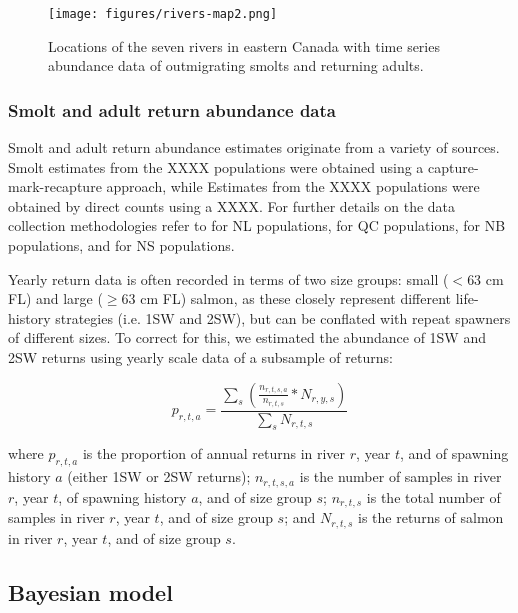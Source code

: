 \documentclass[12pt]{article}
\begin{document}
\begin{figure}[htbp] \centering
    \texttt{[image: figures/rivers-map2.png]}
    \caption{Locations of the seven rivers in eastern Canada with time series abundance data of outmigrating smolts and 
    returning adults.} \label{fig:map} 
\end{figure}

\subsubsection*{Smolt and adult return abundance data}

Smolt and adult return abundance estimates originate from a variety of
sources. Smolt estimates from the XXXX populations were obtained using a
capture-mark-recapture approach, while Estimates from the XXXX populations
were obtained by direct counts using a XXXX.
For further details on the data collection methodologies refer to 
\citet{Venoitt2018} for NL populations, 
\citet{April2018}  for QC populations,
\citet{Jones2014} for NB populations,
and \citet{Gibson2009} for NS populations. 

Yearly return data is often recorded in terms of two size groups: small ($< 63$ cm
FL) and large ($\geq 63$ cm FL) salmon, as these closely represent different
life-history strategies (i.e. 1SW and 2SW), but can be conflated with repeat
spawners of different sizes. To correct for this, we estimated the abundance
of 1SW and 2SW returns using yearly scale data of a subsample of returns:

\begin{equation}
    p_{r,t,a} = \frac{\sum_{s}{(\frac{n_{r,t,s,a}}{n_{r,t,s}} * N_{r,y,s})}}{\sum_{s}{N_{r,t,s}}}
\end{equation}

where $p_{r,t,a}$ is the proportion of annual returns in river $r$, year $t$,
and of spawning history $a$ (either 1SW or 2SW returns); $n_{r,t,s,a}$ is the
number of samples in river $r$, year $t$, of spawning history $a$, and of size
group $s$; $n_{r,t,s}$ is the total number of samples in river $r$, year $t$,
and of size group $s$; and $N_{r,t,s}$ is the returns of salmon
in river $r$, year $t$, and of size group $s$.

\subsection*{Bayesian model}
\end{document}
